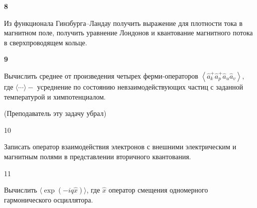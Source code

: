 \documentclass[a4paper,12pt]{article} %
\begin{document}
\begin{task} \textbf{8}



Из функционала Гинзбурга–Ландау получить выражение для плотности тока в магнитном поле, получить уравнение Лондонов и квантование магнитного потока в сверхпроводящем кольце.























\end{task}





\begin{task} \textbf{9}
	
	
Вычислить среднее от произведения четырех ферми-операторов  
$\left\langle\hat{a}_{k}^{+} \hat{a}_{p}^{+} \hat{a}_{u} \hat{a}_{v}\right\rangle,$ 
где $\langle\cdots\rangle-$ усреднение по состоянию невзаимодействующих частиц с заданной температурой и химпотенциалом.

(Преподаватель эту задачу убрал)










\end{task}


\begin{task}

10

Записать оператор взаимодействия электронов с внешними электрическим и магнитным полями в представлении вторичного квантования.











\end{task}


\begin{task}

11

Вычислить  $\langle\exp (-i q \hat{x})\rangle$, где  $\hat{x}$ оператор смещения одномерного гармонического осциллятора.














\end{task}
\end{document}

